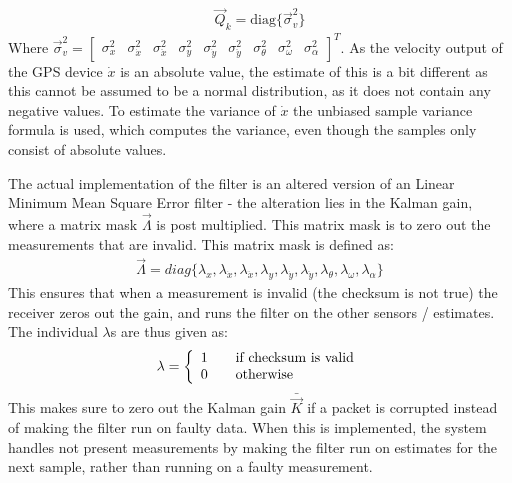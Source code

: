 \documentclass{ifacconf}
\begin{document}
\begin{align}
\vec{Q}_k = \text{diag}\{\vec{\sigma}^2_{v}\}
\end{align}
Where $\vec{\sigma}^2_v = \begin{bmatrix} \sigma^2_{x} & \sigma^2_{\dot{x}} & \sigma^2_{\ddot{x}} & \sigma^2_{y} & \sigma^2_{\dot{y}} & \sigma^2_{\ddot{y}} & \sigma^2_{\theta} & \sigma^2_{\omega} & \sigma^2_{\alpha} \end{bmatrix}^T$. As the velocity output of the GPS device $\dot{x}$ is an absolute value, the estimate of this is a bit different as this cannot be assumed to be a normal distribution, as it does not contain any negative values. To estimate the variance of $\dot{x}$ the unbiased sample variance formula is used, which computes the variance, even though the samples only consist of absolute values. 

The actual implementation of the filter is an altered version of an Linear Minimum Mean Square Error filter - the alteration lies in the Kalman gain, where a matrix mask $\vec{\Lambda}$ is post multiplied. This matrix mask is to zero out the measurements that are invalid. This matrix mask is defined as:
\begin{align}
\vec{\Lambda} = diag\{ \lambda_x,\lambda_{\dot{x}},\lambda_{\ddot{x}},\lambda_y,\lambda_{\dot{y}},\lambda_{\ddot{y}},\lambda_{\theta},\lambda_{\omega},\lambda_{\alpha} \}
\end{align}
This ensures that when a measurement is invalid (the checksum is not true) the receiver zeros out the gain, and runs the filter on the other sensors / estimates. The individual $\lambda$s are thus given as:
\begin{align}
\lambda = 
\left\{
  \begin{array}{l l}
    1 & \quad \text{if checksum is valid}\\
    0 & \quad \text{otherwise}
  \end{array} \right.
\end{align} 
This makes sure to zero out the Kalman gain $\bar{\vec{K}}$ if a packet is corrupted instead of making the filter run on faulty data. When this is implemented, the system handles not present measurements by making the filter run on estimates for the next sample, rather than running on a faulty measurement.
\end{document}

